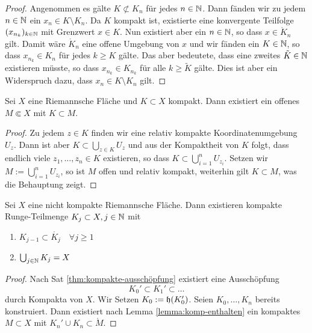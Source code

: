 \begin{proof}
  Angenommen es gälte $K \not \subset K_n$ für jedes $n \in \mathbb{N}$. Dann
  fänden wir zu jedem $n \in \mathbb{N}$ ein $x_n \in K\setminus K_n$. Da $K$
  kompakt ist, existierte eine konvergente Teilfolge $(x_{n_k})_{k\in
    \mathbb{N}}$ mit Grenzwert $x \in K$. Nun existiert aber ein $n \in \mathbb{N}$,
  so dass $x \in \mathring K_n$ gilt. Damit wäre $\mathring K_n$ eine offene
  Umgebung von $x$ und wir fänden ein $K \in \mathbb{N}$, so dass $x_{n_k} \in
  K_n$ für jedes $k\geq K$ gälte. Das aber bedeutete, dass eine
  zweites $\tilde K \in \mathbb{N}$ existieren müsste, so dass $x_{n_k} \in K_{n_k}$
  für alle $k \geq \tilde K$ gälte. Dies ist aber ein Widerspruch dazu,
  dass $x_n \in K \setminus K_n$ gilt.
\end{proof}


\begin{lemma}
  \label{lemma:komp-enthalten}
  Sei $X$ eine Riemannsche Fläche und $K \subset X$ kompakt. Dann
  existiert ein offenes $M \Subset X$ mit $K \subset M$.
\end{lemma}

\begin{proof}
  Zu jedem $z \in K$ finden wir eine relativ kompakte
  Koordinatenumgebung $U_z$. Dann ist aber $K \subset \bigcup_{z \in
    K}U_z$ und aus der Kompaktheit von $K$ folgt, dass endlich viele
  $z_1, \dots, z_n \in K$ existieren, so dass $K \subset
  \bigcup_{i=1}^n U_{z_i}$. Setzen wir $M := \bigcup_{i=1}^n U_{z_i}$,
  so ist $M$ offen und relativ kompakt, weiterhin gilt $K \subset M$,
  was die Behauptung zeigt.
\end{proof}

\begin{cor}
  \label{cor:ausschöpfung-kompakt}
  Sei $X$ eine nicht kompakte Riemannsche Fläche. Dann existieren
  kompakte Runge-Teilmenge $K_j \subset X, j \in \mathbb{N}$ mit
  \begin{enumerate}
  \item $K_{j-1} \subset \mathring{K_j} \quad \forall j \geq 1$
  \item $\bigcup_{j\in \mathbb{N}} K_j = X$
  \end{enumerate}
\end{cor}

\begin{proof}
  Nach Sat \ref{thm:kompakte-ausschöpfung} existiert eine 
  Ausschöpfung
  \[
  K_0' \subset K_1' \subset \dots
  \]
  durch Kompakta von $X$. Wir Setzen $K_0 := \mathfrak{h}(K_0')$. Seien
  $K_0, \dots, K_n$ bereits konstruiert. Dann existiert nach Lemma
  \ref{lemma:komp-enthalten} ein
  kompaktes $M \subset X$ mit $K_n' \cup K_n \subset \mathring
  M$. 
\end{proof}

